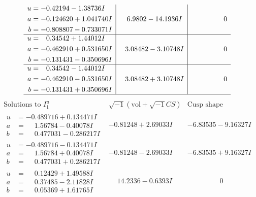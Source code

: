 \documentclass[1p]{elsarticle_modified}
\theoremstyle{definition}
\newcommand{\I}{\sqrt{-1}}
\begin{document}
$$\begin{array}{c|c|c}
\begin{aligned}
u &= -0.42194 - 1.38736 I \\
a &= -0.124620 + 1.041740 I \\
b &= -0.808807 - 0.733071 I\end{aligned}
 & \phantom{-}6.9802 - 14.1936 I & \phantom{-0.000000 } 0 \\ \hline\begin{aligned}
u &= \phantom{-}0.34542 + 1.44012 I \\
a &= -0.462910 + 0.531650 I \\
b &= -0.131431 - 0.350696 I\end{aligned}
 & \phantom{-}3.08482 - 3.10748 I & \phantom{-0.000000 } 0 \\ \hline\begin{aligned}
u &= \phantom{-}0.34542 - 1.44012 I \\
a &= -0.462910 - 0.531650 I \\
b &= -0.131431 + 0.350696 I\end{aligned}
 & \phantom{-}3.08482 + 3.10748 I & \phantom{-0.000000 } 0\\
 \hline 
 \end{array}$$\newpage$$\begin{array}{c|c|c}  
\text{Solutions to }I^u_{1}& \I (\text{vol} + \sqrt{-1}CS) & \text{Cusp shape}\\
 \hline 
\begin{aligned}
u &= -0.489716 + 0.134471 I \\
a &= \phantom{-}1.56784 - 0.40078 I \\
b &= \phantom{-}0.477031 - 0.286217 I\end{aligned}
 & -0.81248 + 2.69033 I & -6.83535 - 9.16327 I \\ \hline\begin{aligned}
u &= -0.489716 - 0.134471 I \\
a &= \phantom{-}1.56784 + 0.40078 I \\
b &= \phantom{-}0.477031 + 0.286217 I\end{aligned}
 & -0.81248 - 2.69033 I & -6.83535 + 9.16327 I \\ \hline\begin{aligned}
u &= \phantom{-}0.12429 + 1.49588 I \\
a &= \phantom{-}0.37485 - 2.11828 I \\
b &= \phantom{-}0.05369 + 1.61765 I\end{aligned}
 & \phantom{-}14.2336 - 0.6393 I & \phantom{-0.000000 } 0 \\ \hline\begin{aligned}

\end{aligned}
\end{array}$$
\end{document}
